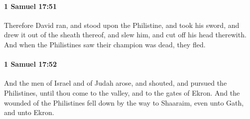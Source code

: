 		\paragraph{1 Samuel 17:51} %
			\label{1SAMUEL-17-51}

			Therefore David ran, and stood upon the Philistine, and took his sword, and drew it out of the sheath thereof, and slew him, and cut off his head therewith. And when the Philistines saw their champion was dead, they fled.


		\paragraph{1 Samuel 17:52} %
			\label{1SAMUEL-17-52}

			And the men of Israel and of Judah arose, and shouted, and pursued the Philistines, until thou come to the valley, and to the gates of Ekron. And the wounded of the Philistines fell down by the way to Shaaraim, even unto Gath, and unto Ekron.

